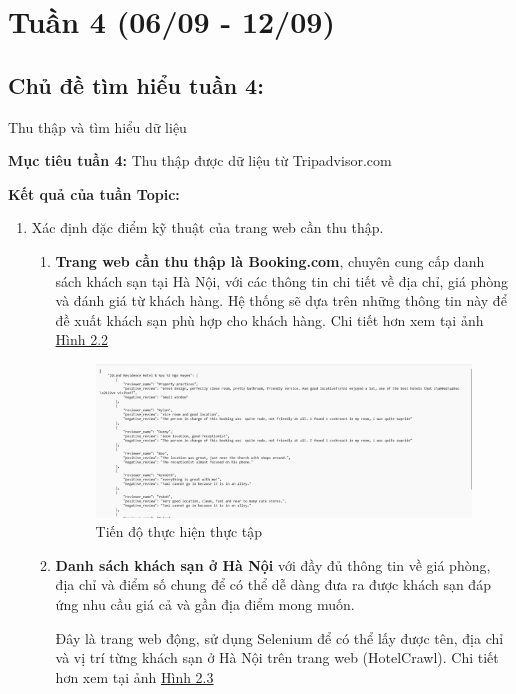 \section*{Tuần 4 (06/09 - 12/09)}
\subsection{Chủ đề tìm hiểu tuần 4:} Thu thập và tìm hiểu dữ liệu

\textbf{Mục tiêu tuần 4:} Thu thập được dữ liệu từ Tripadvisor.com

\textbf{Kết quả của tuần Topic:}
\begin{enumerate}
    \item Xác định đặc điểm kỹ thuật của trang web cần thu thập.
    \begin{enumerate}
        \item \textbf{Trang web cần thu thập là Booking.com}, chuyên cung cấp danh sách khách sạn tại Hà Nội, với các thông tin chi tiết về địa chỉ, giá phòng và đánh giá từ khách hàng. Hệ thống sẽ dựa trên những thông tin này để đề xuất khách sạn phù hợp cho khách hàng. Chi tiết hơn xem tại ảnh \hyperref[fig:image]{Hình 2.2}
        
        \begin{figure} %
        \centering
        \includegraphics[width=1.0\linewidth]{Figures/1.1.png}
        \caption{Tiến độ thực hiện thực tập}
        \label{fig:image}
        \end{figure}
        
        \item \textbf{Danh sách khách sạn ở Hà Nội} với đầy đủ thông tin về giá phòng, địa chỉ và điểm số chung để có thể dễ dàng đưa ra được khách sạn đáp ứng nhu cầu giá cả và gần địa điểm mong muốn.

        Đây là trang web động, sử dụng Selenium để có thể lấy được tên, địa chỉ và vị trí từng khách sạn ở Hà Nội trên trang web (HotelCrawl). Chi tiết hơn xem tại ảnh \hyperref[fig:image1.2]{Hình 2.3}
        

\end{enumerate}
\end{enumerate}
